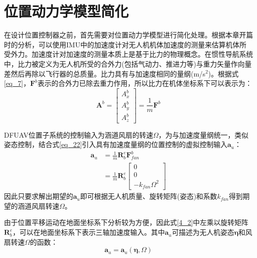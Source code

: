 \section{位置动力学模型简化}\label{位置动力学模型简化}

在设计位置控制器之前，首先需要对位置动力学模型进行简化处理。根据本章开篇时的分析，可以使用IMU中的加速度计对无人机机体加速度的测量来估算机体所受外力。加速度计对加速度的测量本质上是基于比力的物理概念。在惯性导航系统中，比力被定义为无人机所受的合外力(包括气动力、推进力等)与重力矢量作向量差然后再除以飞行器的总质量。比力具有与加速度相同的量纲(m/s$^2$)。根据式\eqref{eq_7}，$\boldsymbol{F}^b$表示的合外力已除去重力作用，所以比力在机体坐标系下可以表示为：
\begin{equation}
    \boldsymbol{A}^b=
    \begin{bmatrix}
    A_x^b \\
    A_y^b \\
    A_z^b
    \end{bmatrix}=\frac{1}{m}\boldsymbol{F}^b
    \label{4_1}
\end{equation}

DFUAV位置子系统的控制输入为涵道风扇的转速$\Omega$，为与加速度量纲统一，类似姿态控制，结合式\eqref{eq_22}引入具有加速度量纲的位置控制的虚拟控制输入$\boldsymbol{a}_u$：
\begin{equation}
    \begin{aligned}
        \boldsymbol{a}_u&=\frac{1}{m}\boldsymbol{R}_b^e\boldsymbol{F}^b_{fan}\\
        &=\frac{1}{m}\boldsymbol{R}_b^e\begin{bmatrix}0 \\ 0 \\
            -k_{fan}\Omega^2
        \end{bmatrix}
    \end{aligned}
    \label{4_2}
\end{equation}
因此只要求解出期望的$\boldsymbol{a}_u$即可根据无人机质量、旋转矩阵(姿态)和系数$k_{fan}$得到期望的涵道风扇转速$\Omega$。

由于位置平移运动在地面坐标系下分析较为方便，因此式\eqref{4_2}中左乘以旋转矩阵$\boldsymbol{R}_b^e$，可以在地面坐标系下表示三轴加速度输入。其中$\boldsymbol{a}_u$可描述为无人机姿态$\boldsymbol{\eta}$和风扇转速$\Omega$的函数：
\begin{equation}
    \boldsymbol{a}_u=\boldsymbol{a}_u(\boldsymbol{\eta},\Omega)
    \label{4_3}
\end{equation}

